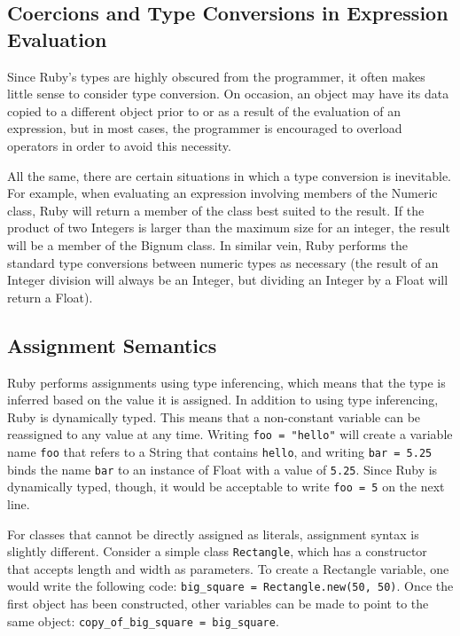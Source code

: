 \documentclass[12pt]{article}
\begin{document}
\subsection{Coercions and Type Conversions in Expression Evaluation}
Since Ruby's types are highly obscured from the programmer, it often makes little sense to consider type conversion. On occasion, an object may have its data copied to a different object prior to or as a result of the evaluation of an expression, but in most cases, the programmer is encouraged to overload operators in order to avoid this necessity.

All the same, there are certain situations in which a type conversion is inevitable. For example, when evaluating an expression involving members of the Numeric class, Ruby will return a member of the class best suited to the result. If the product of two Integers is larger than the maximum size for an integer, the result will be a member of the Bignum class\cite{docs_integer}. In similar vein, Ruby performs the standard type conversions between numeric types as necessary (the result of an Integer division will always be an Integer, but dividing an Integer by a Float will return a Float).

\subsection{Assignment Semantics}
Ruby performs assignments using type inferencing, which means that the type is inferred based on the value it is assigned. In addition to using type inferencing, Ruby is dynamically typed. This means that a non-constant variable can be reassigned to any value at any time. Writing \verb|foo = "hello"| will create a variable name \verb|foo| that refers to a String that contains \verb|hello|, and writing \verb|bar = 5.25| binds the name \verb|bar| to an instance of Float with a value of \verb|5.25|. Since Ruby is dynamically typed, though, it would be acceptable to write \verb|foo = 5| on the next line.

For classes that cannot be directly assigned as literals, assignment syntax is slightly different. Consider a simple class \verb|Rectangle|, which has a constructor that accepts length and width as parameters. To create a Rectangle variable, one would write the following code: \verb|big_square = Rectangle.new(50, 50)|. Once the first object has been constructed, other variables can be made to point to the same object: \verb|copy_of_big_square = big_square|\cite{learning_classes}.
\end{document}
